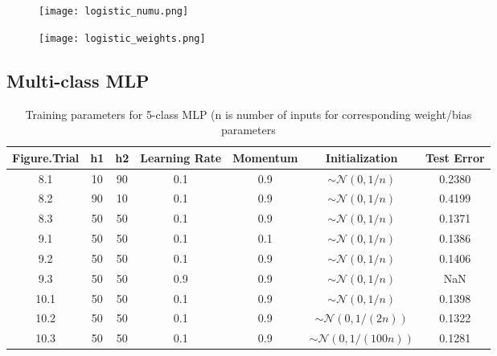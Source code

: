 \documentclass[10pt]{article}
\begin{document}
\begin{figure}[H]
\centering
\begin{minipage}{.48\textwidth}
  \centering
\texttt{[image: logistic\_numu.png]}
\label{logistic_numu}
\end{minipage}
\hspace{.03\textwidth}%
\begin{minipage}{.48\textwidth}
  \centering
\texttt{[image: logistic\_weights.png]}
\label{logistic_weights}
\end{minipage}
\end{figure}

\subsection{Multi-class MLP}

\begin{table}[H]
\def\arraystretch{1.1}
\small
\center
    \begin{tabular}{| c | c | c | c | c | c | c |}
    \hline
    Figure.Trial & h1 & h2 & Learning Rate & Momentum & Initialization & Test Error \\ \hline \hline
    8.1 & 10 & 90 & 0.1 & 0.9 & $\sim \mathcal{N} (0,1/n)$ & 0.2380  \\ \hline
    8.2 & 90 & 10 & 0.1 & 0.9 & $\sim \mathcal{N} (0,1/n)$ & 0.4199 \\ \hline
    8.3 & 50 & 50 & 0.1 & 0.9 & $\sim \mathcal{N} (0,1/n)$ & 0.1371 \\ \hline
    9.1 & 50 & 50 & 0.1 & 0.1 & $\sim \mathcal{N} (0,1/n)$ & 0.1386\\ \hline
    9.2 & 50 & 50 & 0.1 & 0.9 & $\sim \mathcal{N} (0,1/n)$ & 0.1406 \\ \hline
    9.3 & 50 & 50 & 0.9 & 0.9 & $\sim \mathcal{N} (0,1/n)$ & NaN  \\ \hline
    10.1 & 50 & 50 & 0.1 & 0.9 & $\sim \mathcal{N} (0,1/n)$ & 0.1398 \\ \hline
    10.2 & 50 & 50 & 0.1 & 0.9 & $\sim \mathcal{N} (0,1/(2n))$ & 0.1322 \\\hline
    10.3 & 50 & 50 & 0.1 & 0.9 & $\sim \mathcal{N} (0,1/(100n))$ & 0.1281\\
    \hline
    \end{tabular}
    \caption{Training parameters for 5-class MLP (n is number of inputs for corresponding weight/bias parameters}
    \label{parameters_multi}
\end{table}
\end{document}
